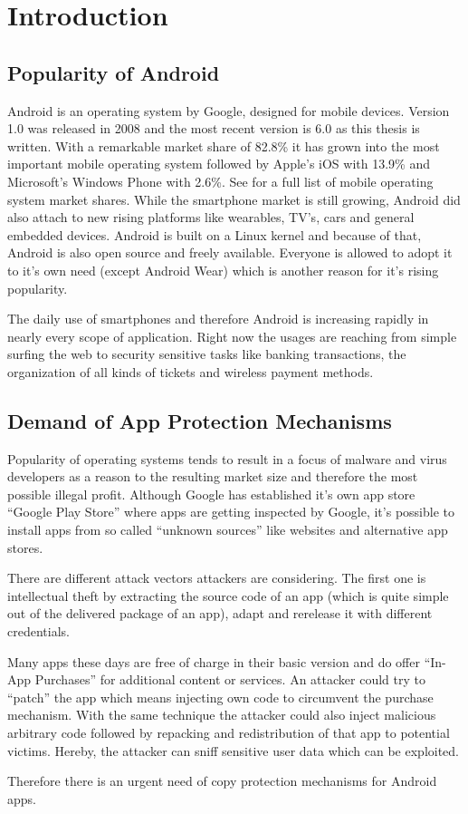 \chapter{Introduction}\label{chapter:android_status_quo}

\section{Popularity of Android}
Android is an operating system by Google,
designed for mobile devices. Version 1.0 was released
in 2008 and the most recent version is 6.0 as this thesis
is written. With a remarkable market share of 82.8\%
it has grown into the most important mobile operating system
followed by Apple's iOS with 13.9\% and Microsoft's Windows
Phone with 2.6\%. See \parencite{marketshare} for a full list
of mobile operating system market shares. While the smartphone
market is still growing, Android did also attach to new
rising platforms like wearables, TV's, cars and general
embedded devices. Android is built on a Linux kernel
and because of that, Android is also open source and freely
available. Everyone is allowed to adopt it to it's own need
(except Android Wear) which is another reason for it's
rising popularity.

The daily use of smartphones and therefore Android is increasing
rapidly in nearly every scope of application. Right now the usages
are reaching from simple surfing the web to security sensitive tasks
like banking transactions, the organization of all kinds of tickets
and wireless payment methods.

\section{Demand of App Protection Mechanisms}
Popularity of operating systems tends to result in a focus of
malware and virus developers as a reason to the resulting market
size and therefore the most possible illegal profit.
Although Google has established it's own app store
``Google Play Store'' where apps are getting inspected by Google,
it's possible to install apps from so called ``unknown sources''
like websites and alternative app stores.

There are different attack vectors attackers are considering.
The first one is intellectual theft by extracting the source
code of an app (which is quite simple out of the delivered
package of an app), adapt and rerelease it with different credentials.


Many apps these days are free of charge in their basic version and
do offer ``In-App Purchases'' for additional content or services.
An attacker could try to ``patch'' the app which means
injecting own code to circumvent the purchase mechanism.
With the same technique the attacker could also inject malicious
arbitrary code followed by repacking and redistribution of that
app to potential victims. Hereby, the attacker can sniff
sensitive user data which can be exploited.

Therefore there is an urgent need of copy protection mechanisms
for Android apps.

